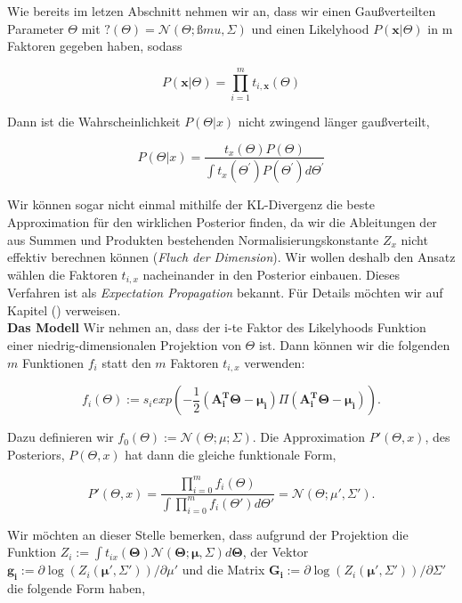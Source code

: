 \documentclass[12pt,a4paper]{scrartcl}
\numberwithin{equation}{section}
\begin{document}
Wie bereits im letzen Abschnitt nehmen wir an, dass wir einen Gaußverteilten Parameter $\Theta$ mit 
$?(\Theta) = \mathcal{N}(\Theta; ßmu, \varSigma)$ und einen Likelyhood $P(\mathbf{x}|\Theta)$ in m Faktoren gegeben haben,
sodass 

\begin{equation}
 P(\mathbf{x}|\Theta) = \prod_{i=1}^m t_{i,\mathbf{x}}(\Theta)
\end{equation}

Dann ist die Wahrscheinlichkeit $P(\varTheta|x)$ nicht zwingend länger gaußverteilt, 

\begin{equation}
  P(\varTheta|x) = \frac{t_x(\varTheta)P(\varTheta)}{\int t_x(\varTheta^{'})P(\varTheta^{'})d\varTheta^{'}}
\end{equation}

Wir können sogar nicht einmal mithilfe der KL-Divergenz die beste Approximation für den wirklichen Posterior finden, 
da wir die Ableitungen der aus Summen und Produkten bestehenden Normalisierungskonstante $Z_x$ nicht effektiv
berechnen können (\textit{Fluch der Dimension}). Wir wollen deshalb den Ansatz wählen die Faktoren 
$t_{i,x}$ nacheinander in den Posterior einbauen. Dieses Verfahren ist als \textit{Expectation Propagation} bekannt. 
Für Details möchten wir auf Kapitel () verweisen. \\

\textbf{Das Modell	} Wir nehmen an, dass der i-te Faktor des Likelyhoods Funktion einer niedrig-dimensionalen Projektion von $\Theta$ ist. 
Dann können wir die folgenden $m$ Funktionen $f_i$ statt den $m$ Faktoren $t_{i,x}$ verwenden:

\begin{equation}
 f_i(\Theta) := s_i exp(- \frac{1}{2} (\mathbf{A_i^T \Theta - \mu_i}) \Pi (\mathbf{A_i^T \Theta - \mu_i})).
\end{equation}

Dazu definieren wir $f_0(\Theta) := \mathcal{N}(\Theta; \mu; \varSigma)$. Die Approximation $P'(\Theta,x)$, des Posteriors, $P(\Theta,x)$ hat dann
die gleiche funktionale Form, 

\begin{equation}
 P'(\Theta,x) = \frac{ \prod_{i=0}^m f_i(\Theta)}{ \int \prod_{i=0}^m f_i(\Theta') d \Theta' } = \mathcal{N}(\Theta; \mu', \varSigma').
\end{equation}

Wir möchten an dieser Stelle bemerken, dass aufgrund der Projektion die Funktion 
$Z_i := \int t_{ix}(\mathbf{\Theta}) \mathcal{N}(\mathbf{\Theta; \mu, \varSigma}) d \mathbf{\Theta}$, der Vektor
$\mathbf{g_i} := \partial \log(Z_i(\mathbf{\mu', \varSigma'}))/\partial \mu'$ und die Matrix
$\mathbf{G_i} := \partial \log(Z_i(\mathbf{\mu',\varSigma'}))/\partial \mathbf{\varSigma'}$ die folgende Form haben,
\end{document}
